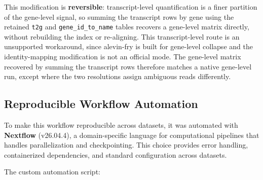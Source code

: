 This modification is \textbf{reversible}: transcript-level quantification is a finer partition of the gene-level signal, so summing the transcript rows by gene using the retained \texttt{t2g} and \texttt{gene\_id\_to\_name} tables recovers a gene-level matrix directly, without rebuilding the index or re-aligning. This transcript-level route is an unsupported workaround, since alevin-fry is built for gene-level collapse and the identity-mapping modification is not an official mode. The gene-level matrix recovered by summing the transcript rows therefore matches a native gene-level run, except where the two resolutions assign ambiguous reads differently.

\subsection*{Reproducible Workflow Automation}

To make this workflow reproducible across datasets, it was automated with \textbf{Nextflow}\cite{ditommaso2017nextflow} (v26.04.4), a domain-specific language for computational pipelines that handles parallelization and checkpointing. This choice provides error handling, containerized dependencies, and standard configuration across datasets.

The custom automation script:

